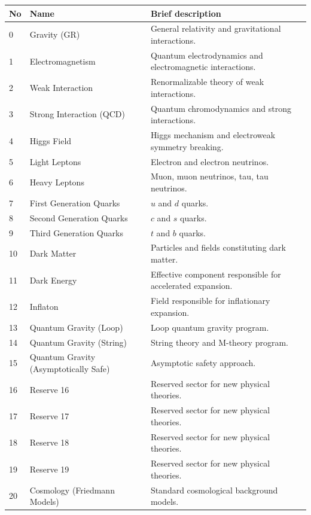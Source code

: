 \documentclass[13pt,a4paper]{article}
\begin{document}
	\begin{longtable}{|p{0.9cm}|p{6.0cm}|p{8.6cm}|}
		\hline
		\textbf{No} & \textbf{Name} & \textbf{Brief description} \\
		\hline
		\endhead
		0 & Gravity (GR) & General relativity and gravitational interactions. \\
		\hline
		1 & Electromagnetism & Quantum electrodynamics and electromagnetic interactions. \\
		\hline
		2 & Weak Interaction & Renormalizable theory of weak interactions. \\
		\hline
		3 & Strong Interaction (QCD) & Quantum chromodynamics and strong interactions. \\
		\hline
		4 & Higgs Field & Higgs mechanism and electroweak symmetry breaking. \\
		\hline
		5 & Light Leptons & Electron and electron neutrinos. \\
		\hline
		6 & Heavy Leptons & Muon, muon neutrinos, tau, tau neutrinos. \\
		\hline
		7 & First Generation Quarks & $u$ and $d$ quarks. \\
		\hline
		8 & Second Generation Quarks & $c$ and $s$ quarks. \\
		\hline
		9 & Third Generation Quarks & $t$ and $b$ quarks. \\
		\hline
		10 & Dark Matter & Particles and fields constituting dark matter. \\
		\hline
		11 & Dark Energy & Effective component responsible for accelerated expansion. \\
		\hline
		12 & Inflaton & Field responsible for inflationary expansion. \\
		\hline
		13 & Quantum Gravity (Loop) & Loop quantum gravity program. \\
		\hline
		14 & Quantum Gravity (String) & String theory and M-theory program. \\
		\hline
		15 & Quantum Gravity (Asymptotically Safe) & Asymptotic safety approach. \\
		\hline
		16 & Reserve 16 & Reserved sector for new physical theories. \\
		\hline
		17 & Reserve 17 & Reserved sector for new physical theories. \\
		\hline
		18 & Reserve 18 & Reserved sector for new physical theories. \\
		\hline
		19 & Reserve 19 & Reserved sector for new physical theories. \\
		\hline
		20 & Cosmology (Friedmann Models) & Standard cosmological background models. \\

\end{longtable}
\end{document}
